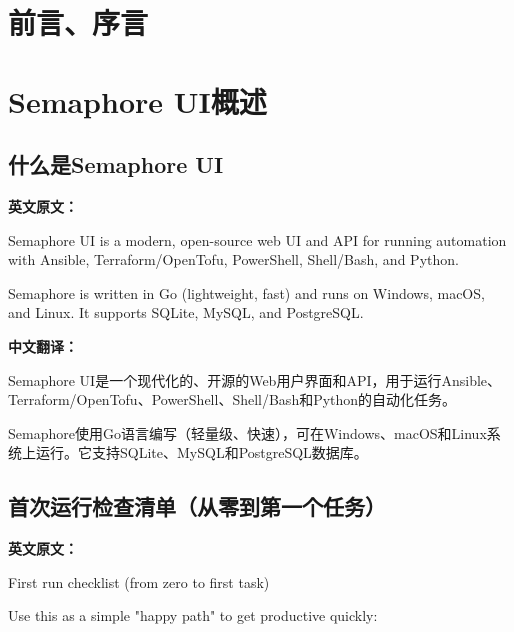 \documentclass[12pt,UTF8]{ctexbook}
\begin{document}
\frontmatter
\chapter{前言、序言}

\mainmatter

\chapter{Semaphore UI概述}

\section{什么是Semaphore UI}

\textbf{英文原文：}

Semaphore UI is a modern, open-source web UI and API for running automation with Ansible, Terraform/OpenTofu, PowerShell, Shell/Bash, and Python. 

Semaphore is written in Go (lightweight, fast) and runs on Windows, macOS, and Linux. It supports SQLite, MySQL, and PostgreSQL.

\textbf{中文翻译：}

Semaphore UI是一个现代化的、开源的Web用户界面和API，用于运行Ansible、Terraform/OpenTofu、PowerShell、Shell/Bash和Python的自动化任务。

Semaphore使用Go语言编写（轻量级、快速），可在Windows、macOS和Linux系统上运行。它支持SQLite、MySQL和PostgreSQL数据库。

\section{首次运行检查清单（从零到第一个任务）}

\textbf{英文原文：}

First run checklist (from zero to first task) 

Use this as a simple "happy path" to get productive quickly: 
\end{document}
